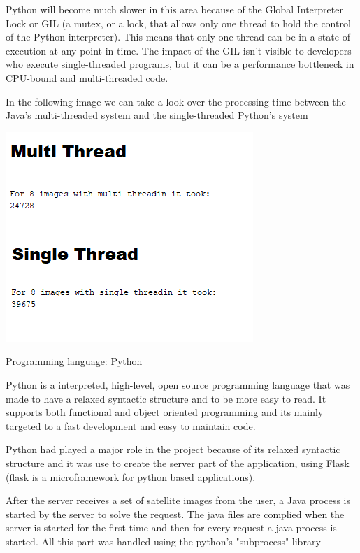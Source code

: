 \documentclass[12pt, a4paper]{report}
\begin{document}
Python will become much slower in this area because of the Global Interpreter Lock or GIL (a mutex, or a lock, that allows only one thread to hold the control of the Python interpreter). This means that only one thread can be in a state of execution at any point in time. The impact of the GIL isn’t visible to developers who execute single-threaded programs, but it can be a performance bottleneck in CPU-bound and multi-threaded code.
\par
\bigskip

In the following image we can take a look over the processing time between the Java's multi-threaded system and the single-threaded Python's system
\par

\includegraphics[scale=0.6]{multi_thread.png}
\par

{\Large Programming language: Python\par}
\medskip

Python is a interpreted, high-level, open source programming language that was made to have a  relaxed syntactic structure and to be more easy to read. It supports both functional and object oriented programming and its mainly targeted to a fast development and easy to maintain code.
\par

Python had played a major role in the project because of its relaxed syntactic structure and it was use to create the server part of the application, using Flask (flask is a microframework for python based applications).
\par 

After the server receives a set of satellite images from the user, a Java process is started by the server to solve the request. The java files are complied when the server is started for the first time and then for every request a java process is started. All this part was handled using the python's "subprocess" library
\par
\medskip
\end{document}
